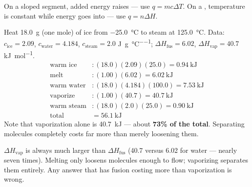 \documentclass{apchem-notes}
\begin{document}


\begin{center}
\end{center}

On a sloped segment, added energy raises
 --- use $q = mc\Delta T$.
On a , temperature is constant while energy goes
into  --- use $q = n\Delta H$.

\begin{workedexample}
Heat \SI{18.0}{\gram} (one mole) of ice from \SI{-25.0}{\celsius} to steam
at \SI{125.0}{\celsius}. Data: $c_{\text{ice}} = 2.09$,
$c_{\text{water}} = 4.184$, $c_{\text{steam}} = 2.0$
\si{\joule\per\gram\per\celsius}; $\Delta H_{\text{fus}} = 6.02$,
$\Delta H_{\text{vap}} = 40.7$ \si{\kilo\joule\per\mole}.
\begin{align*}
  \text{warm ice} &: (18.0)(2.09)(25.0) = \SI{0.94}{\kilo\joule}\\
  \text{melt} &: (1.00)(6.02) = \SI{6.02}{\kilo\joule}\\
  \text{warm water} &: (18.0)(4.184)(100.0) = \SI{7.53}{\kilo\joule}\\
  \text{vaporize} &: (1.00)(40.7) = \SI{40.7}{\kilo\joule}\\
  \text{warm steam} &: (18.0)(2.0)(25.0) = \SI{0.90}{\kilo\joule}\\[2pt]
  \text{total} &= \SI{56.1}{\kilo\joule}
\end{align*}
Note that vaporization alone is \SI{40.7}{\kilo\joule} --- about
\textbf{73\% of the total}. Separating molecules completely costs far more
than merely loosening them.
\end{workedexample}

\begin{apctrap}
$\Delta H_{\text{vap}}$ is always much larger than $\Delta H_{\text{fus}}$
(40.7 versus 6.02 for water --- nearly seven times). Melting only loosens
molecules enough to flow; vaporizing separates them entirely. Any answer
that has fusion costing more than vaporization is wrong.
\end{apctrap}
\end{document}
